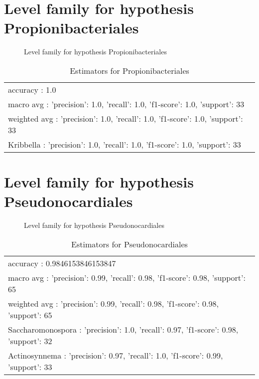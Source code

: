 \documentclass[12pt]{article}
\begin{document}
\clearpage
\pagebreak[4]
\section*{Level family for hypothesis Propionibacteriales}
\begin{figure}[h]
\centering


\caption{Level family for hypothesis Propionibacteriales}
\label{f-Level family for hypothesis Propionibacteriales}
\end{figure}
\begin{table}[htp]
\begin{tabular}{l}
accuracy : 1.0 \\
macro avg : {'precision': 1.0, 'recall': 1.0, 'f1-score': 1.0, 'support': 33} \\
weighted avg : {'precision': 1.0, 'recall': 1.0, 'f1-score': 1.0, 'support': 33} \\
Kribbella : {'precision': 1.0, 'recall': 1.0, 'f1-score': 1.0, 'support': 33}
\end{tabular}
\caption*{Estimators for Propionibacteriales}
\end{table}




\clearpage
\pagebreak[4]
\section*{Level family for hypothesis Pseudonocardiales}
\begin{figure}[h]
\centering


\caption{Level family for hypothesis Pseudonocardiales}
\label{f-Level family for hypothesis Pseudonocardiales}
\end{figure}
\begin{table}[htp]
\begin{tabular}{l}
accuracy : 0.9846153846153847 \\
macro avg : {'precision': 0.99, 'recall': 0.98, 'f1-score': 0.98, 'support': 65} \\
weighted avg : {'precision': 0.99, 'recall': 0.98, 'f1-score': 0.98, 'support': 65} \\
Saccharomonospora : {'precision': 1.0, 'recall': 0.97, 'f1-score': 0.98, 'support': 32} \\
Actinosynnema : {'precision': 0.97, 'recall': 1.0, 'f1-score': 0.99, 'support': 33}
\end{tabular}
\caption*{Estimators for Pseudonocardiales}
\end{table}
\end{document}
